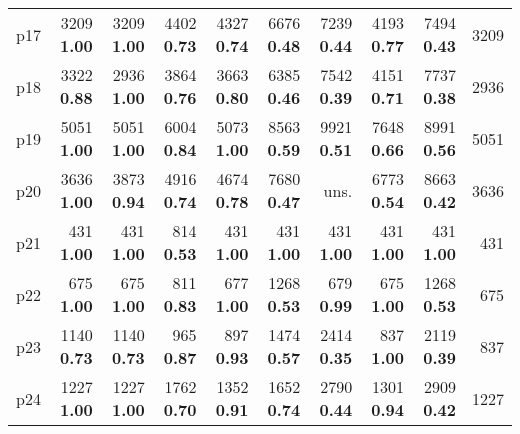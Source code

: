 \begin{tabular}{|l|rrrrrrrr|r|}
p17 & {\footnotesize 3209} \textbf{1.00} & {\footnotesize 3209} \textbf{1.00} & {\footnotesize 4402} \textbf{0.73} & {\footnotesize 4327} \textbf{0.74} & {\footnotesize 6676} \textbf{0.48} & {\footnotesize 7239} \textbf{0.44} & {\footnotesize 4193} \textbf{0.77} & {\footnotesize 7494} \textbf{0.43} & 3209\\
p18 & {\footnotesize 3322} \textbf{0.88} & {\footnotesize 2936} \textbf{1.00} & {\footnotesize 3864} \textbf{0.76} & {\footnotesize 3663} \textbf{0.80} & {\footnotesize 6385} \textbf{0.46} & {\footnotesize 7542} \textbf{0.39} & {\footnotesize 4151} \textbf{0.71} & {\footnotesize 7737} \textbf{0.38} & 2936\\
p19 & {\footnotesize 5051} \textbf{1.00} & {\footnotesize 5051} \textbf{1.00} & {\footnotesize 6004} \textbf{0.84} & {\footnotesize 5073} \textbf{1.00} & {\footnotesize 8563} \textbf{0.59} & {\footnotesize 9921} \textbf{0.51} & {\footnotesize 7648} \textbf{0.66} & {\footnotesize 8991} \textbf{0.56} & 5051\\
p20 & {\footnotesize 3636} \textbf{1.00} & {\footnotesize 3873} \textbf{0.94} & {\footnotesize 4916} \textbf{0.74} & {\footnotesize 4674} \textbf{0.78} & {\footnotesize 7680} \textbf{0.47} & uns. & {\footnotesize 6773} \textbf{0.54} & {\footnotesize 8663} \textbf{0.42} & 3636\\
p21 & {\footnotesize 431} \textbf{1.00} & {\footnotesize 431} \textbf{1.00} & {\footnotesize 814} \textbf{0.53} & {\footnotesize 431} \textbf{1.00} & {\footnotesize 431} \textbf{1.00} & {\footnotesize 431} \textbf{1.00} & {\footnotesize 431} \textbf{1.00} & {\footnotesize 431} \textbf{1.00} & 431\\
p22 & {\footnotesize 675} \textbf{1.00} & {\footnotesize 675} \textbf{1.00} & {\footnotesize 811} \textbf{0.83} & {\footnotesize 677} \textbf{1.00} & {\footnotesize 1268} \textbf{0.53} & {\footnotesize 679} \textbf{0.99} & {\footnotesize 675} \textbf{1.00} & {\footnotesize 1268} \textbf{0.53} & 675\\
p23 & {\footnotesize 1140} \textbf{0.73} & {\footnotesize 1140} \textbf{0.73} & {\footnotesize 965} \textbf{0.87} & {\footnotesize 897} \textbf{0.93} & {\footnotesize 1474} \textbf{0.57} & {\footnotesize 2414} \textbf{0.35} & {\footnotesize 837} \textbf{1.00} & {\footnotesize 2119} \textbf{0.39} & 837\\
p24 & {\footnotesize 1227} \textbf{1.00} & {\footnotesize 1227} \textbf{1.00} & {\footnotesize 1762} \textbf{0.70} & {\footnotesize 1352} \textbf{0.91} & {\footnotesize 1652} \textbf{0.74} & {\footnotesize 2790} \textbf{0.44} & {\footnotesize 1301} \textbf{0.94} & {\footnotesize 2909} \textbf{0.42} & 1227\\

\end{tabular}

